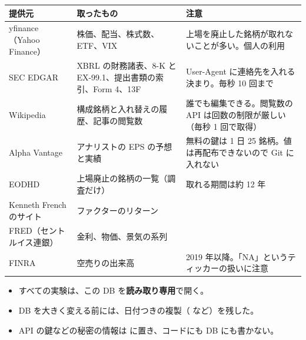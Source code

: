 \begin{longtable}{P{3.4cm}P{5.4cm}P{5.6cm}}
\toprule
\textbf{提供元} & \textbf{取ったもの} & \textbf{注意} \\
\midrule
\endhead
\bottomrule
\endfoot
yfinance（Yahoo Finance） & 株価、配当、株式数、ETF、VIX & 上場を廃止した銘柄が取れないことが多い。個人の利用 \\
SEC EDGAR & XBRL の財務諸表、8-K と EX-99.1、提出書類の索引、Form 4、13F & User-Agent に連絡先を入れる決まり。毎秒 10 回まで \\
Wikipedia & 構成銘柄と入れ替えの履歴、記事の閲覧数 & 誰でも編集できる。閲覧数の API は回数の制限が厳しい（毎秒 1 回で取得） \\
Alpha Vantage & アナリストの EPS の予想と実績 & 無料の鍵は 1 日 25 銘柄。値は再配布できないので Git に入れない \\
EODHD & 上場廃止の銘柄の一覧（調査だけ） & 取れる期間は約 12 年 \\
Kenneth French のサイト & ファクターのリターン & \\
FRED（セントルイス連銀） & 金利、物価、景気の系列 & \\
FINRA & 空売りの出来高 & 2019 年以降。「NA」というティッカーの扱いに注意 \\
\end{longtable}

\begin{projbox}
\begin{itemize}
\item すべての実験は、この DB を\textbf{読み取り専用}で開く。
\item DB を大きく変える前には、日付つきの複製（ など）を残した。
\item API の鍵などの秘密の情報は  に置き、コードにも DB にも書かない。
\end{itemize}
\end{projbox}
